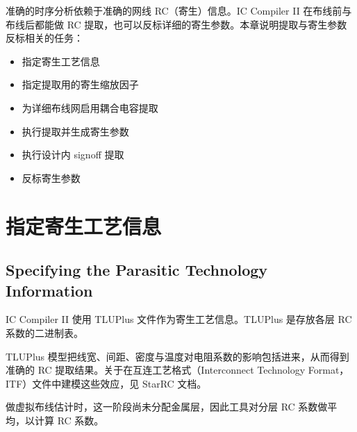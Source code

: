 \label{chap:extract}

准确的时序分析依赖于准确的网线 RC（寄生）信息。IC Compiler II 在布线前与布线后都能做 RC 提取，也可以反标详细的寄生参数。本章说明提取与寄生参数反标相关的任务：
\begin{itemize}
  \item 指定寄生工艺信息
  \item 指定提取用的寄生缩放因子
  \item 为详细布线网启用耦合电容提取
  \item 执行提取并生成寄生参数
  \item 执行设计内 signoff 提取
  \item 反标寄生参数
\end{itemize}

\section{指定寄生工艺信息}
\subsection*{Specifying the Parasitic Technology Information}

IC Compiler II 使用 TLUPlus 文件作为寄生工艺信息。TLUPlus 是存放各层 RC 系数的二进制表。

TLUPlus 模型把线宽、间距、密度与温度对电阻系数的影响包括进来，从而得到准确的 RC 提取结果。关于在互连工艺格式（Interconnect Technology Format，ITF）文件中建模这些效应，见 StarRC 文档。

做虚拟布线估计时，这一阶段尚未分配金属层，因此工具对分层 RC 系数做平均，以计算 RC 系数。

